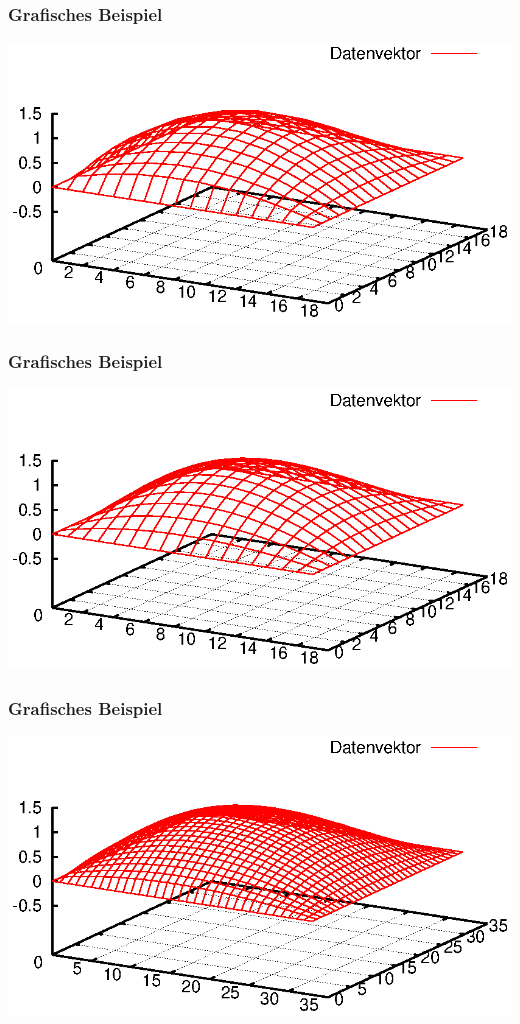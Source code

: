 \documentclass{beamer}
\begin{document}
\begin{frame}\frametitle{Grafisches Beispiel}\includegraphics[trim=25 0 25 0, clip, width=\textwidth]{plots/006}\end{frame}
\begin{frame}\frametitle{Grafisches Beispiel}\includegraphics[trim=25 0 25 0, clip, width=\textwidth]{plots/007}\end{frame}
\begin{frame}\frametitle{Grafisches Beispiel}\includegraphics[trim=25 0 25 0, clip, width=\textwidth]{plots/008}\end{frame}
\end{document}
